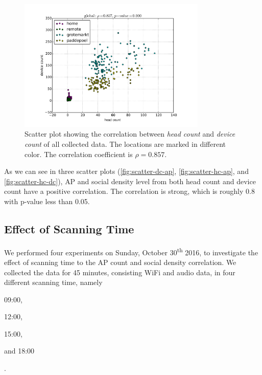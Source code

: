 	\begin{figure}[H]
		\centering
		\includegraphics[width=0.8\textwidth]{./img/result/global-gt-vs-pr}
		\caption[Scatter plot showing the correlation of head count and device count.]
		{Scatter plot showing the correlation between \textit{head count} and \textit{device count} of all collected data. The locations are marked in different color. The correlation coefficient is $\rho=0.857$.}
		\label{fig:scatter-hc-dc}
	\end{figure}

	As we can see in three scatter plots (\autoref{fig:scatter-dc-ap}, \autoref{fig:scatter-hc-ap}, and \autoref{fig:scatter-hc-dc}), \ac{AP} and social density level from both head count and device count have a positive correlation. The correlation is strong, which is roughly 0.8 with p-value less than 0.05. 






	\subsection{Effect of Scanning Time} %
	\label{sub:effect_of_scanning_time}
	We performed four experiments on Sunday, October 30\textsuperscript{th} 2016, to investigate the effect of scanning time to the \ac{AP} count and social density correlation. We collected the data for 45 minutes, consisting WiFi and audio data, in four different scanning time, namely
	\begin{enumerate*}[label={\alph*)},font={\color{red!50!black}\bfseries}]
	  \item 09:00,
	  \item 12:00,
	  \item 15:00,
	  \item and 18:00
	\end{enumerate*}.
	
